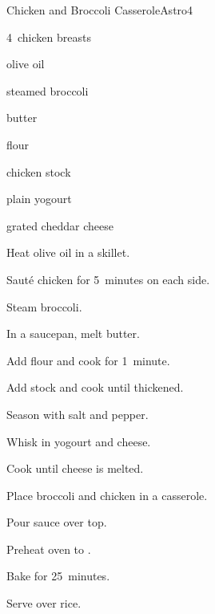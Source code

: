 \begin{recipe}{Chicken and Broccoli Casserole}{Astro}{4}

\begin{ingredients}
\item 4~chicken breasts
\item {} olive oil
\item {} steamed broccoli
\item {} butter
\item {} flour
\item \C{1\half} chicken stock
\item {} plain yogourt
\item \C{\half} grated cheddar cheese
\end{ingredients}

\begin{directions}
\item Heat olive oil in a skillet.
\item Saut\'e chicken for 5~minutes on each side.
\item Steam broccoli.
\item In a saucepan, melt butter.
\item Add flour and cook for 1~minute.
\item Add stock and cook until thickened.
\item Season with salt and pepper.
\item Whisk in yogourt and cheese.
\item Cook until cheese is melted.
\item Place broccoli and chicken in a casserole.
\item Pour sauce over top.
\item Preheat oven to .
\item Bake for 25~minutes.
\item Serve over rice.
\end{directions}

\end{recipe}
